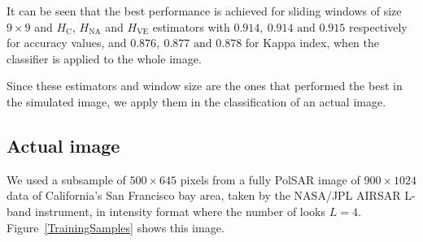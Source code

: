 \documentclass[journal]{IEEEtran}
\begin{document}

It can be seen that the best performance is achieved for sliding windows of size $9 \times 9$ and $H_\text{C}$, $H_{\text{NA}}$ and $H_{\text{VE}}$ estimators with $0.914, \ 0.914 \text{ and } 0.915$ respectively for accuracy values,  and  $0.876, \ 0.877 \text{ and } 0.878$ for Kappa index, when the classifier is applied to the whole image.

Since these estimators and window size are the ones that performed the best in the simulated image, we apply them in the classification of an actual image.

\subsection{Actual image}

We used a subsample of $500 \times 645$ pixels from a fully PolSAR image of $900 \times 1024$ data of California's San Francisco bay area, taken by the NASA/JPL AIRSAR L-band instrument, in intensity format where the number of looks $L=4$. Figure~\ref{TrainingSamples} shows this image.
\end{document}
